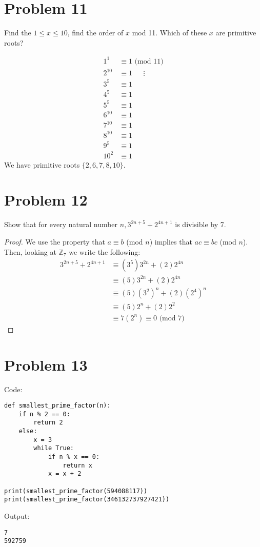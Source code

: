 \documentclass{article}
\theoremstyle{definition}
\begin{document}
\section*{Problem 11}
    \begin{mdframed}
        Find the $1 \leqslant x \leqslant 10$, find the order of $x$ mod 11. Which of these $x$ are primitive roots?
    \end{mdframed}
    \begin{align*}
        1^1 & \equiv 1 \text{ (mod } 11\text{)}\\
        2^{10} & \equiv 1 \ \ \ \ \ \ \ \vdots \\
        3^5 & \equiv 1 \\
        4^5 & \equiv 1 \\
        5^5 & \equiv 1 \\
        6^{10} & \equiv 1 \\
        7^{10} & \equiv 1 \\
        8^{10} & \equiv 1 \\
        9^5 & \equiv 1 \\
        10^2 & \equiv 1 
    \end{align*}
    We have primitive roots $\{2,6,7,8,10\}$.
\section*{Problem 12}
    \begin{mdframed}
        Show that for every natural number $n, 3^{2n + 5} + 2^{4n + 1}$ is divisible by 7.
    \end{mdframed}
    \begin{proof}
        We use the property that $a \equiv b$ (mod $n$) implies that $ac \equiv bc$ (mod $n$). Then,
        looking at $\mathbb{Z}_7$ we write the following:
        \begin{align*}
            3^{2n + 5} + 2^{4n + 1} &\equiv (3^5)3^{2n} + (2)2^{4n} \\
            & \equiv (5)3^{2n} + (2)2^{4n} \\
            & \equiv (5)(3^2)^n + (2)(2^4)^n \\
            & \equiv (5)2^n + (2)2^2 \\
            & \equiv 7(2^n) \equiv 0 \text{ (mod 7)}
        \end{align*}
    \end{proof}
\section*{Problem 13}
    \begin{mdframed}
        Code:
        \begin{verbatim}
def smallest_prime_factor(n):
    if n % 2 == 0:
        return 2
    else:
        x = 3
        while True:
            if n % x == 0:
                return x
            x = x + 2

print(smallest_prime_factor(594088117))
print(smallest_prime_factor(346132737927421))
        \end{verbatim}
        Output:
        \begin{verbatim}
7
592759
        \end{verbatim}
    \end{mdframed}
\end{document}
